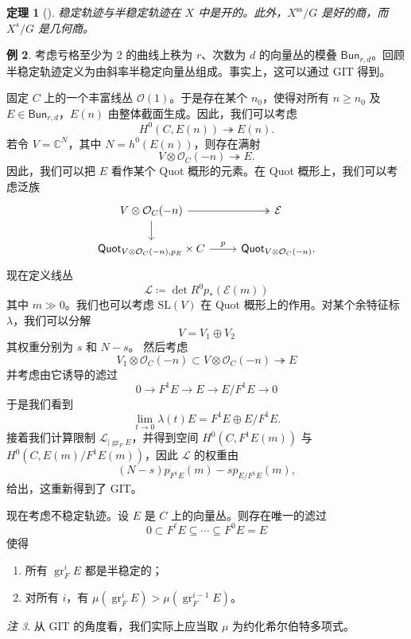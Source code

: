 \documentclass{amsart}
\newtheorem{thm}{定理}[section]
\theoremstyle{definition}
\newtheorem{exm}[thm]{例}
\theoremstyle{remark}
\newtheorem{rmk}[thm]{注}
\theoremstyle{plain}
\theoremstyle{definition}
\theoremstyle{remark}
\newcommand{\C}{\mathbb{C}}
\newcommand{\mc}[1]{\mathcal{#1}}
\newcommand{\mr}[1]{\mathrm{#1}}
\newcommand{\on}[1]{\operatorname{#1}}
\newcommand{\ms}[1]{\mathsf{#1}}
\newcommand{\1}{\mathbf{1}}
\newcommand{\2}{\mathbf{2}}
\newcommand{\3}{\mathbf{3}}
\begin{document}
\begin{thm}[{\cite{MFK1994}}]
    稳定轨迹与半稳定轨迹在 \(X\) 中是开的。此外，\(X^{\on{ss}}/G\) 是好的商，而 \(X^s/G\) 是几何商。  
\end{thm}

\begin{exm}
    考虑亏格至少为 \(2\) 的曲线上秩为 \(r\)、次数为 \(d\) 的向量丛的模叠 \(\ms{Bun}_{r,d}\)。回顾半稳定轨迹定义为由斜率半稳定向量丛组成。事实上，这可以通过 GIT 得到。

    固定 \(C\) 上的一个丰富线丛 \(\mc{O}(1)\)。于是存在某个 \(n_0\)，使得对所有 \(n \geq n_0\) 及 \(E \in \ms{Bun}_{r,d}\)，\(E(n)\) 由整体截面生成。因此，我们可以考虑
    \[ H^0(C, E(n)) \twoheadrightarrow E(n). \]
    若令 \(V = \C^N\)，其中 \(N = h^0(E(n))\)，则存在满射
    \[ V \otimes \mc{O}_C(-n) \twoheadrightarrow E. \]
    因此，我们可以把 \(E\) 看作某个 Quot 概形的元素。在 Quot 概形上，我们可以考虑泛族
    \begin{equation*}
    \begin{tikzcd}
        V \otimes \mc{O}_C(-n) \ar[twoheadrightarrow]{r} \ar{d} & \mc{E} \\
        \ms{Quot}_{V \otimes \mc{O}_C(-n), p_E} \times C \ar{r}{p} & \ms{Quot}_{V \otimes \mc{O}_C(-n)}.
    \end{tikzcd}
    \end{equation*}
    现在定义线丛
    \[ \mc{L} \coloneqq \det R^0 p_* (\mc{E}(m)) \]
    其中 \(m \gg 0\)。我们也可以考虑 \(\mr{SL}(V)\) 在 Quot 概形上的作用。对某个余特征标 \(\lambda\)，我们可以分解
    \[ V = V_1 \oplus V_2 \]
    其权重分别为 \(s\) 和 \(N-s\)。
    然后考虑
    \[ V_1 \otimes \mc{O}_C(-n) \subset V \otimes \mc{O}_C(-n) \twoheadrightarrow E \]
    并考虑由它诱导的滤过
    \[ 0 \to F^1 E \to E \to E / F^1 E \to 0 \]
    于是我们看到
    \[ \lim_{t \to 0} \lambda(t) E = F^1 E \oplus E/F^1 E. \]
    接着我们计算限制 \(\mc{L}_{|\on{gr}_F E}\)，并得到空间 \(H^0(C, F^1 E(m))\) 与 \(H^0(C, E(m)/F^1 E(m))\)，因此 \(\mc{L}\) 的权重由
    \[ (N-s) p_{F^1 E}(m) - s p_{E/F^1 E}(m), \]
    给出，这重新得到了 GIT。
\end{exm}

现在考虑不稳定轨迹。设 \(E\) 是 \(C\) 上的向量丛。则存在唯一的滤过
\[ 0 \subset F^{\ell} E \subseteq \cdots \subseteq F^0 E = E \]
使得
\begin{enumerate}
    \item 所有 \(\on{gr}_F^i E\) 都是半稳定的；
    \item 对所有 \(i\)，有 \(\mu(\on{gr}_F^i E) > \mu(\on{gr}_F^{i-1} E)\)。 
\end{enumerate}
\begin{rmk}
    从 GIT 的角度看，我们实际上应当取 \(\mu\) 为约化希尔伯特多项式。
\end{rmk}
\end{document}
